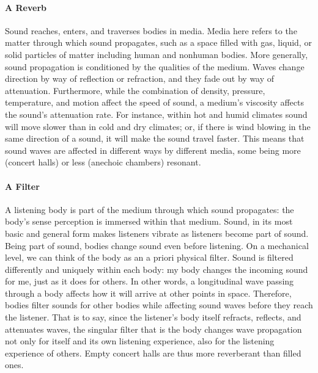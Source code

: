 \paragraph{A Reverb}
Sound reaches, enters, and traverses bodies in media. Media here refers to the matter through which sound propagates, such as a space filled with gas, liquid, or solid particles of matter including human and nonhuman bodies. More generally, sound propagation is conditioned by the qualities of the medium. Waves change direction by way of reflection or refraction, and they fade out by way of attenuation. Furthermore, while the combination of density, pressure, temperature, and motion affect the speed of sound, a medium's viscosity affects the sound's attenuation rate. For instance, within hot and humid climates sound will move slower than in cold and dry climates; or, if there is wind blowing in the same direction of a sound, it will make the sound travel faster. This means that sound waves are affected in different ways by different media, some being more (concert halls) or less (anechoic chambers) resonant.

\paragraph{A Filter}
A listening body is part of the medium through which sound propagates: the body's sense perception is immersed within that medium. Sound, in its most basic and general form makes listeners vibrate as listeners become part of sound. Being part of sound, bodies change sound even before listening. On a mechanical level, we can think of the body as an a priori physical filter. Sound is filtered differently and uniquely within each body: my body changes the incoming sound for me, just as it does for others. In other words, a longitudinal wave passing through a body affects how it will arrive at other points in space. Therefore, bodies filter sounds for other bodies while affecting sound waves before they reach the listener. That is to say, since the listener's body itself refracts, reflects, and attenuates waves, the singular filter that is the body changes wave propagation not only for itself and its own listening experience, also for the listening experience of others. Empty concert halls are thus more reverberant than filled ones. 


